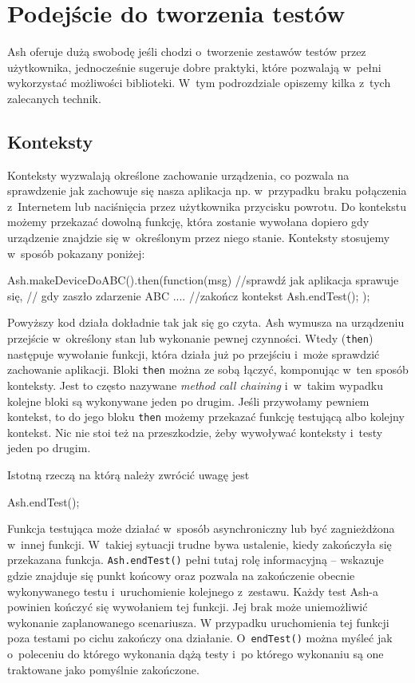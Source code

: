 \documentclass{xmgr}
\begin{document}
\section{Podejście do tworzenia testów}

Ash oferuje dużą swobodę jeśli chodzi o~tworzenie zestawów testów przez użytkownika, jednocześnie sugeruje dobre praktyki, które pozwalają w~pełni wykorzystać możliwości biblioteki. W~tym podrozdziale opiszemy kilka z~tych zalecanych technik.    

\subsection{Konteksty}

Konteksty wyzwalają określone zachowanie urządzenia, co pozwala na sprawdzenie jak zachowuje się nasza aplikacja np. w~przypadku braku połączenia z~Internetem lub naciśnięcia przez użytkownika przycisku powrotu. Do kontekstu możemy przekazać dowolną funkcję, która zostanie wywołana dopiero gdy urządzenie znajdzie się w~określonym przez niego stanie. Konteksty stosujemy w~sposób pokazany poniżej:

\begin{javascriptcode}
  Ash.makeDeviceDoABC().then(function(msg){
      //sprawdź jak aplikacja sprawuje się, 
      //  gdy zaszło zdarzenie ABC
      ....
      //zakończ kontekst
      Ash.endTest();
  });
\end{javascriptcode}

Powyższy kod działa dokładnie tak jak się go czyta. Ash wymusza na urządzeniu przejście w~określony stan lub wykonanie pewnej czynności. Wtedy (\texttt{then}) następuje wywołanie funkcji, która działa już po przejściu i~może sprawdzić zachowanie aplikacji. Bloki \texttt{then} można ze sobą łączyć, komponując w~ten sposób konteksty. Jest to często nazywane \textit{method call chaining} i~w~takim wypadku kolejne bloki są wykonywane jeden po drugim. Jeśli przywołamy pewniem kontekst, to do jego bloku \texttt{then} możemy przekazać funkcję testującą albo kolejny kontekst. Nic nie stoi też na przeszkodzie, żeby wywoływać konteksty i~testy jeden po drugim. 

Istotną rzeczą na którą należy zwrócić uwagę jest 

\begin{javascriptcode}
   Ash.endTest();
\end{javascriptcode}

Funkcja testująca może działać w~sposób asynchroniczny lub być zagnieżdżona w~innej funkcji. W~takiej sytuacji trudne bywa ustalenie, kiedy zakończyła się przekazana funkcja. \texttt{Ash.endTest()} pełni tutaj rolę informacyjną -- wskazuje gdzie znajduje się punkt końcowy oraz pozwala na zakończenie obecnie wykonywanego testu i~uruchomienie kolejnego z~zestawu. Każdy test Ash-a powinien kończyć się wywołaniem tej funkcji. Jej brak może uniemożliwić wykonanie zaplanowanego scenariusza. W przypadku uruchomienia tej funkcji poza testami po cichu zakończy ona działanie. O~\texttt{endTest()} można myśleć jak o~poleceniu do którego wykonania dążą testy i~po którego wykonaniu są one traktowane jako pomyślnie zakończone. 
\end{document}
